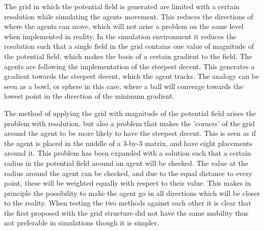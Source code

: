 The grid in which the potential field is generated are limited with a
certain resolution while simulating the agents movement. This reduces
the directions of where the agents can move, which will not arise a
problem on the same level when implemented in reality. In the
simulation environment it reduces the resolution such that a single
field in the grid contains one value of magnitude of the potential
field, which makes the basis of a certain gradient to the field. The
agents are following the implementation of the steepest decent. This
generates a gradient towards the steepest decent, which the agent
tracks. The analogy can be seen as a bowl, or sphere in this case,
where a ball will converge towards the lowest point in the direction
of the minimum gradient.

The method of applying the grid with magnitude of the potential field
arises the problem with resolution, but also a problem that makes the
'corners' of the grid around the agent to be more likely to have the
steepest decent. This is seen as if the agent is placed in the middle
of a 3-by-3 matrix, and have eight placements around it. This problem
has been expanded with a solution such that a certain radius in the
potential field around an agent will be checked. The value at the
radius around the agent can be checked, and due to the equal distance
to every point, these will be weighted equally with respect to their
value. This makes in principle the possibility to make the agent go in
all directions which will be closer to the reality. When testing the
two methods against each other it is clear that the first proposed
with the grid structure did not have the same mobility thus not
preferable in simulations though it is simpler.

